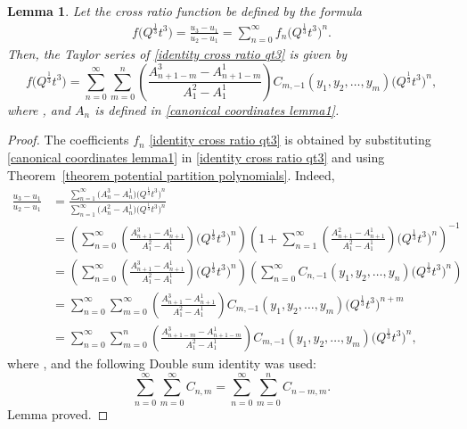 \documentclass[11pt]{article}
\numberwithin{equation}{section}
\numberwithin{equation}{section}
\newtheorem{Lemma}[Theorem]{Lemma}
\begin{document}
\begin{Lemma}
Let the cross ratio function be defined by the formula
\begin{gather}
f\bigl(Q^{\frac{1}{3}}t^3\bigr)=\frac{u_3-u_1}{u_2-u_1} =\sum_{n=0}^{\infty} f_n \bigl(Q^{\frac{1}{3}}t^3\bigr)^n.\label{identity cross ratio qt3}
\end{gather}
Then, the Taylor series of \eqref{identity cross ratio qt3} is given by
\[%
f\bigl(Q^{\frac{1}{3}}t^3\bigr)=\sum_{n=0}^{\infty} \sum_{m=0}^{n}\left(\frac{A_{n+1-m}^3-A_{n+1-m}^1}{A_1^2-A_1^1}\right)C_{m,-1}(y_1,y_2,\dots,y_m) \bigl( Q^{\frac{1}{3}}t^3 \bigr)^{n},
\]
where
,
and $A_n$ is defined in \eqref{canonical coordinates lemma1}.
\end{Lemma}

\begin{proof}
The coefficients $f_n$ \eqref{identity cross ratio qt3} is obtained by substituting \eqref{canonical coordinates lemma1} in \eqref{identity cross ratio qt3} and using Theorem~\ref{theorem potential partition polynomials}. Indeed,
\begin{align*}%
\frac{u_3-u_1}{u_2-u_1}&= \frac{\sum_{n=1}^{\infty} \bigl(A_n^3-A_n^1\bigr) \bigl( Q^{\frac{1}{3}}t^3 \bigr)^n}{\sum_{n=1}^{\infty} \bigl(A_n^2-A_n^1\bigr) \bigl( Q^{\frac{1}{3}}t^3 \bigr)^n}\\
&=\left(\sum_{n=0}^{\infty} \left(\frac{A_{n+1}^3-A_{n+1}^1}{A_1^2-A_1^1}\right) \bigl( Q^{\frac{1}{3}}t^3 \bigr)^n\right)\left(1+\sum_{n=1}^{\infty} \left(\frac{A_{n+1}^2-A_{n+1}^1}{A_1^2-A_1^1}\right) \bigl( Q^{\frac{1}{3}}t^3 \bigr)^n\right)^{-1}\\
&=\left(\sum_{n=0}^{\infty} \left(\frac{A_{n+1}^3-A_{n+1}^1}{A_1^2-A_1^1}\right) \bigl( Q^{\frac{1}{3}}t^3 \bigr)^n\right)\left(\sum_{n=0}^{\infty} C_{n,-1}(y_1,y_2,\dots,y_n) \bigl( Q^{\frac{1}{3}}t^3 \bigr)^n\right)\\
&=\sum_{n=0}^{\infty} \sum_{m=0}^{\infty}\left(\frac{A_{n+1}^3-A_{n+1}^1}{A_1^2-A_1^1}\right)C_{m,-1}(y_1,y_2,\dots,y_m) \bigl( Q^{\frac{1}{3}}t^3 \bigr)^{n+m}\\
&=\sum_{n=0}^{\infty} \sum_{m=0}^{n}\left(\frac{A_{n+1-m}^3-A_{n+1-m}^1}{A_1^2-A_1^1}\right)C_{m,-1}(y_1,y_2,\dots,y_m) \bigl( Q^{\frac{1}{3}}t^3 \bigr)^{n},
\end{align*}
where
,
and the following Double sum identity was used:
\[
\sum_{n=0}^{\infty}\sum_{m=0}^{\infty} C_{n,m}=\sum_{n=0}^{\infty}\sum_{m=0}^{n} C_{n-m,m}.
\]
Lemma proved.
\end{proof}
\end{document}
